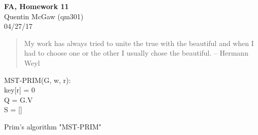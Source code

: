 \documentclass[11pt]{article}
\begin{document}
\begin{center} {\Large\bf FA, Homework 11} \\ Quentin McGaw (qm301) \\ 04/27/17
\end{center}

\begin{quote}
My work has always tried to unite the true with the beautiful and
when I had to choose one or the other I usually chose the beautiful.
--  Hermann Weyl
\end{quote}

\begin{algorithm}
MST-PRIM(G, w, r): \\
key[r] = 0 \\
Q = G.V \\
S = [] \\
\caption{Prim's algorithm "MST-PRIM"}
\end{algorithm}
\end{document}
